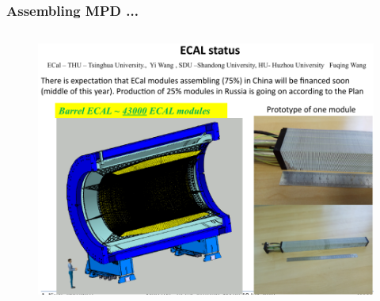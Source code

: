 \documentclass[dvipsnames] {beamer}
\begin{document}
\begin{frame}
  \frametitle {\bf \centering Assembling MPD ...}
   \vskip -0.75cm
  \begin{columns}[t]
   \begin{block}{}
       \begin{figure}[H]
         \includegraphics[width=1.\textwidth]{MPD_ecalFabrication.png}
       \end{figure}
   \end{block}
  \end{columns}
\end{frame}
\end{document}
